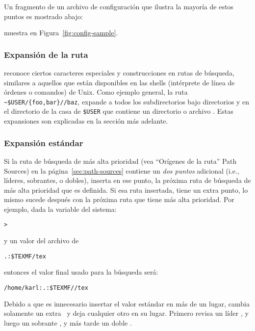 \documentclass{article}
\begin{document}
	Un fragmento de un archivo de configuración que
	ilustra la mayoría de estos puntos es
	\ifSingleColumn
	mostrado abajo:

	
	\else
	muestra en Figura~\ref{fig:config-sample}.
	\fi

	\subsubsection{Expansión de la ruta}
	\label{sec:path-expansion}

	\KPS{} reconoce ciertos caracteres especiales y construcciones en rutas
	de búsqueda, similares a aquellos que están disponibles
	en las shells (intérprete de línea de órdenes o comandos) de Unix.
	Como ejemplo general, la ruta
	\verb+~$USER/{foo,bar}//baz+, expande a todos los
	subdirectorios bajo directorios  y 
	en el directorio de la casa de \texttt{\$USER} que
	contiene un directorio o archivo . Estas
	expansiones son explicadas en la sección más adelante.
	
	\subsubsection{Expansión estándar}
	\label{sec:default-expansion}

        Si la ruta de búsqueda de más alta prioridad (vea ``Orígenes
        de la ruta'' Path Sources) en la página~\ref{sec:path-sources}
        contiene un \emph{dos puntos} adicional (i.e., líderes,
        sobrantes, o dobles), \KPS{} inserta en ese punto, la próxima
        ruta de búsqueda de más alta prioridad que es definida. Si esa
        ruta insertada, tiene un extra punto, lo mismo sucede después con la
        próxima ruta que tiene más alta prioridad.  Por ejemplo, dada la
        variable del sistema:

\begin{alltt}
	> 
\end{alltt}
y un valor  del archivo  de

\begin{alltt}
	.:\$TEXMF/tex
\end{alltt}
entonces el valor final usado para la búsqueda será:

\begin{alltt}
	/home/karl:.:\$TEXMF//tex
\end{alltt}

Debido a que es innecesario insertar el valor estándar en más
de un lugar, \KPS{} cambia solamente un extra \samp{:}\ y deja
cualquier otro en su lugar. Primero revisa un líder \samp{:},
y luego un sobrante \samp{:}, y más tarde un doble \samp{:}.
\end{document}
